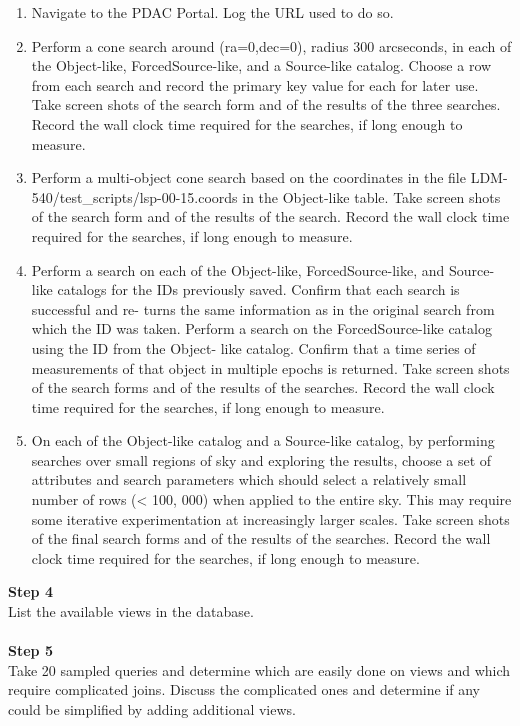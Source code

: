 \begin{enumerate}
\tightlist
\item
  Navigate to the PDAC Portal. Log the URL used to do so.
\item
  Perform a cone search around (ra=0,dec=0), radius 300 arcseconds, in
  each of the Object-like, ForcedSource-like, and a Source-like catalog.
  Choose a row from each search and record the primary key value for
  each for later use. Take screen shots of the search form and of the
  results of the three searches. Record the wall clock time required for
  the searches, if long enough to measure.
\item
  Perform a multi-object cone search based on the coordinates in the
  file LDM-540/test\_scripts/lsp-00-15.coords in the Object-like table.
  Take screen shots of the search form and of the results of the search.
  Record the wall clock time required for the searches, if long enough
  to measure.
\item
  Perform a search on each of the Object-like, ForcedSource-like, and
  Source-like catalogs for the IDs previously saved. Confirm that each
  search is successful and re- turns the same information as in the
  original search from which the ID was taken. Perform a search on the
  ForcedSource-like catalog using the ID from the Object- like catalog.
  Confirm that a time series of measurements of that object in multiple
  epochs is returned. Take screen shots of the search forms and of the
  results of the searches. Record the wall clock time required for the
  searches, if long enough to measure.
\item
  On each of the Object-like catalog and a Source-like catalog, by
  performing searches over small regions of sky and exploring the
  results, choose a set of attributes and search parameters which should
  select a relatively small number of rows (\textless{} 100, 000) when
  applied to the entire sky. This may require some iterative
  experimentation at increasingly larger scales. Take screen shots of
  the final search forms and of the results of the searches. Record the
  wall clock time required for the searches, if long enough to measure.
\end{enumerate}

\textbf{Step 4}\\
List the available views in the database.\\
~\\
\textbf{Step 5}\\
{Take 20 sampled queries and determine which are easily done on views
and which require complicated joins. Discuss the complicated ones and
determine if any could be simplified by adding additional views.}\\
~\\

